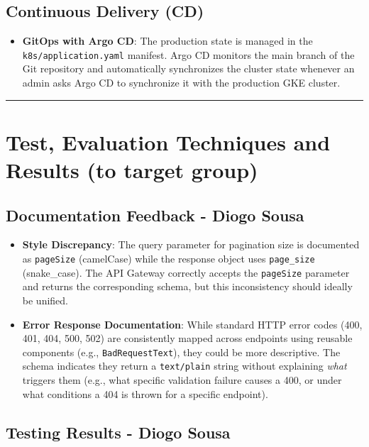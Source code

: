 \documentclass[11pt,a4paper]{article}
\newcommand{\bff}[1]{\textbf{#1}}
\begin{document}
 \subsection{Continuous Delivery (CD)}
 \begin{itemize}
  \item \bff{GitOps with Argo CD}: The production state is managed in the \texttt{k8s/application.yaml} manifest. Argo CD monitors the main branch of the Git repository and automatically synchronizes the cluster state whenever an admin asks Argo CD to synchronize it with the production GKE cluster.
 \end{itemize}

 \vspace{1cm}
 \hrule
 \vspace{1cm}

 \section{Test, Evaluation Techniques and Results (to target group)}

 \subsection{Documentation Feedback - Diogo Sousa}
 \begin{itemize}
  \item \bff{Style Discrepancy}: The query parameter for pagination size is documented as \texttt{pageSize} (camelCase) while the response object uses \texttt{page\_size} (snake\_case). The API Gateway correctly accepts the \texttt{pageSize} parameter and returns the corresponding schema, but this inconsistency should ideally be unified.
  \item \bff{Error Response Documentation}: While standard HTTP error codes (400, 401, 404, 500, 502) are consistently mapped across endpoints using reusable components (e.g., \texttt{BadRequestText}), they could be more descriptive. The schema indicates they return a \texttt{text/plain} string without explaining \textit{what} triggers them (e.g., what specific validation failure causes a 400, or under what conditions a 404 is thrown for a specific endpoint).
 \end{itemize}
 
 \subsection{Testing Results - Diogo Sousa}
 
\end{document}
